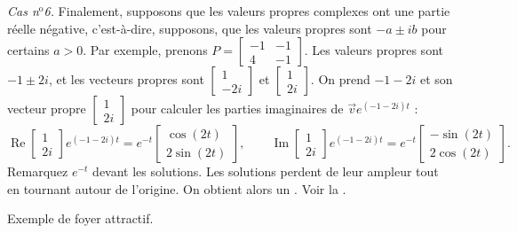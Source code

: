 \medskip

\emph{Cas n$^\text{o}$6.} Finalement, supposons que les valeurs propres complexes ont une partie réelle négative, c'est-à-dire, supposons, que les valeurs propres sont $-a \pm ib$ pour certains $a > 0$.
Par exemple, prenons $P = 
\left[ \begin{smallmatrix} -1 & -1 \\ 4 & -1 \end{smallmatrix} \right]$.
Les valeurs propres sont $-1\pm 2i$, et les vecteurs propres sont
$\left[ \begin{smallmatrix} 1 \\ -2i \end{smallmatrix} \right]$ et
$\left[ \begin{smallmatrix} 1 \\ 2i \end{smallmatrix} \right]$. On prend
$-1 - 2i$ et son vecteur propre
$\left[ \begin{smallmatrix} 1 \\ 2i \end{smallmatrix} \right]$ pour calculer les parties imaginaires de
$\vec{v} e^{(-1-2i)t}$ :
\begin{equation*}
\operatorname{Re}
\begin{bmatrix} 1 \\ 2i \end{bmatrix} e^{(-1-2i)t} =
e^{-t}
\begin{bmatrix} \cos (2t) \\ 2 \sin (2t) \end{bmatrix} ,
\qquad
\operatorname{Im}
\begin{bmatrix} 1 \\ 2i \end{bmatrix} e^{(-1-2i)t} =
e^{-t}
\begin{bmatrix} -\sin (2t) \\ 2 \cos (2t) \end{bmatrix} .
\end{equation*}
Remarquez $e^{-t}$ devant les solutions. Les solutions perdent de leur ampleur tout en tournant autour de l'origine. On obtient alors un \emph{}. Voir la .

\begin{myfig}
\capstart
{}
\caption{Exemple de foyer attractif.\label{pln:spiral-sinkfig}}
\end{myfig}

